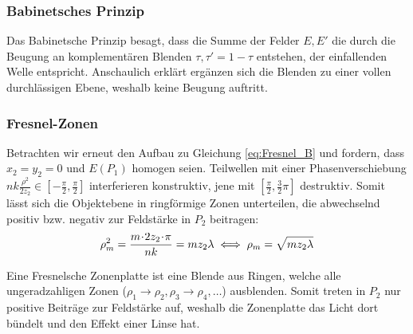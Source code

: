 \subsubsection{Babinetsches Prinzip}
Das Babinetsche Prinzip besagt, dass die Summe der Felder $E, E'$ die durch die Beugung an komplementären Blenden $\tau, \tau' = 1-\tau$ entstehen, der einfallenden Welle entspricht. Anschaulich erklärt ergänzen sich die Blenden zu einer vollen durchlässigen Ebene, weshalb keine Beugung auftritt.


\subsubsection{Fresnel-Zonen}
Betrachten wir erneut den Aufbau zu Gleichung \eqref{eq:Fresnel_B} und fordern, dass $x_2 = y_2 = 0$ und $E(P_1)$ homogen seien. Teilwellen mit einer Phasenverschiebung $n k \frac{\rho^2}{2 z_2} \in [-\tfrac\pi2, \tfrac\pi2 ]$ interferieren konstruktiv, jene mit $[\tfrac\pi2, \tfrac32 \pi ]$ destruktiv.
Somit lässt sich die Objektebene in ringförmige Zonen unterteilen, die abwechselnd positiv bzw. negativ zur Feldstärke in $P_2$ beitragen:
\begin{equation}
\rho_m^2 =  \frac{m \!\cdot\! 2 z_2 \!\cdot\! \pi}{n k} = m z_2 \lambda
\iff \rho_m = \sqrt{m z_2 \lambda}
\end{equation}

Eine Fresnelsche Zonenplatte ist eine Blende aus Ringen, welche alle ungeradzahligen Zonen ($\rho_1 \to \rho_2, \rho_3 \to \rho_4, \dots$) ausblenden. Somit treten in $P_2$ nur positive Beiträge zur Feldstärke auf, weshalb die Zonenplatte das Licht dort bündelt und den Effekt einer Linse hat.



